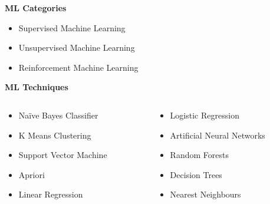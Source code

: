 \documentclass[11pt]{beamer}
\begin{document}
\begin{frame}
\begin{center}
	\textbf{ML Categories}
	\begin{itemize}
		\item Supervised Machine Learning
		\item Unsupervised Machine Learning
		\item Reinforcement Machine Learning
	\end{itemize}
\end{center}
\begin{center}
	\textbf{ML Techniques}
	\begin{columns}
		\begin{column}[t]{0.45\textwidth}
			\begin{itemize}
				\item Naïve Bayes Classifier
				\item K Means Clustering
				\item Support Vector Machine
				\item Apriori 
				\item Linear Regression
			\end{itemize}
		\end{column}
		\begin{column}[t]{0.45\textwidth}
			\begin{itemize}
				\item Logistic Regression
				\item Artificial Neural Networks
				\item Random Forests
				\item Decision Trees
				\item Nearest Neighbours
			\end{itemize}
		\end{column}
	\end{columns}
\end{center}
\cite{Top10Machine}
\end{frame}
\end{document}
